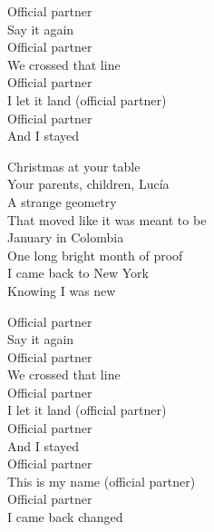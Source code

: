 \begin{lyrics}
Official partner\\
Say it again\\
Official partner\\
We crossed that line\\
Official partner\\
I let it land
(official partner)\\
Official partner\\
And I stayed

Christmas at your table\\
Your parents, children, Lucía\\
A strange geometry\\
That moved like it was meant to be\\
January in Colombia\\
One long bright month of proof\\
I came back to New York\\
Knowing I was new

Official partner\\
Say it again\\
Official partner\\
We crossed that line\\
Official partner\\
I let it land
(official partner)\\
Official partner\\
And I stayed\\
Official partner\\
This is my name
(official partner)\\
Official partner\\
I came back changed
\end{lyrics}

